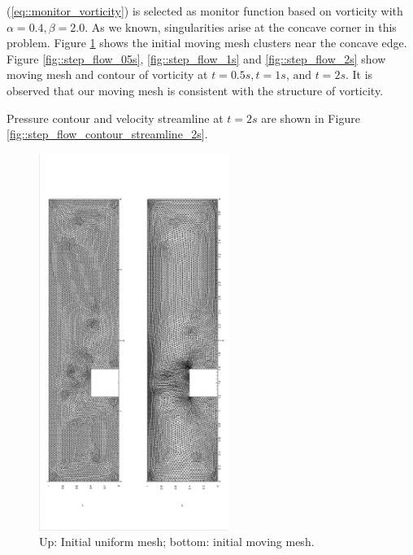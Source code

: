 \documentclass[a4paper, 11pt]{article}
\begin{document}
      (\ref{eq::monitor_vorticity}) is selected as monitor function
      based on vorticity with $\alpha = 0.4, \beta = 2.0$. As we
      known, singularities arise at the concave corner in this
      problem. Figure \ref{fig::step_initial_mesh} shows the initial
      moving mesh clusters near the concave edge. Figure
      \ref{fig::step_flow_05s}, \ref{fig::step_flow_1s} and
      \ref{fig::step_flow_2s} show moving mesh and contour of
      vorticity at $t = 0.5s, t = 1s \text{, and } t = 2s$. It is
      observed that our moving mesh is consistent with the structure of
      vorticity.

      Pressure contour and velocity streamline at $t = 2s$ are shown
      in Figure \ref{fig::step_flow_contour_streamline_2s}.      
       
      \begin{figure}[!htbp]
        \begin{center}
        \includegraphics[width = 0.55\textwidth, angle = -90]{picture/step_flow_data/initial_mesh40_001.eps}
        \caption{\small Up: Initial uniform mesh; bottom: initial moving mesh.}
        \label{fig::step_initial_mesh}
        \end{center}
      \end{figure}
\end{document}
